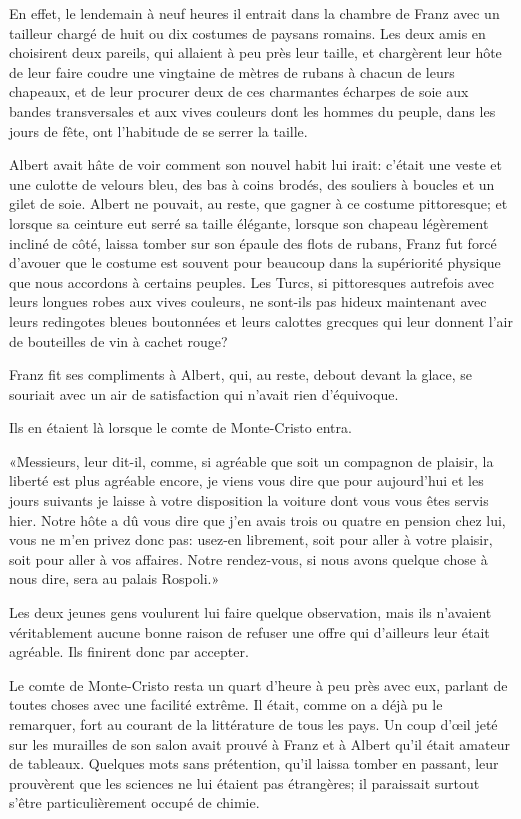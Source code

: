 En effet, le lendemain à neuf heures il entrait dans la chambre de Franz avec un tailleur chargé de huit ou dix costumes de paysans romains. Les deux amis en choisirent deux pareils, qui allaient à peu près leur taille, et chargèrent leur hôte de leur faire coudre une vingtaine de mètres de rubans à chacun de leurs chapeaux, et de leur procurer deux de ces charmantes écharpes de soie aux bandes transversales et aux vives couleurs dont les hommes du peuple, dans les jours de fête, ont l'habitude de se serrer la taille. 

Albert avait hâte de voir comment son nouvel habit lui irait: c'était une veste et une culotte de velours bleu, des bas à coins brodés, des souliers à boucles et un gilet de soie. Albert ne pouvait, au reste, que gagner à ce costume pittoresque; et lorsque sa ceinture eut serré sa taille élégante, lorsque son chapeau légèrement incliné de côté, laissa tomber sur son épaule des flots de rubans, Franz fut forcé d'avouer que le costume est souvent pour beaucoup dans la supériorité physique que nous accordons à certains peuples. Les Turcs, si pittoresques autrefois avec leurs longues robes aux vives couleurs, ne sont-ils pas hideux maintenant avec leurs redingotes bleues boutonnées et leurs calottes grecques qui leur donnent l'air de bouteilles de vin à cachet rouge? 

Franz fit ses compliments à Albert, qui, au reste, debout devant la glace, se souriait avec un air de satisfaction qui n'avait rien d'équivoque. 

Ils en étaient là lorsque le comte de Monte-Cristo entra. 

«Messieurs, leur dit-il, comme, si agréable que soit un compagnon de plaisir, la liberté est plus agréable encore, je viens vous dire que pour aujourd'hui et les jours suivants je laisse à votre disposition la voiture dont vous vous êtes servis hier. Notre hôte a dû vous dire que j'en avais trois ou quatre en pension chez lui, vous ne m'en privez donc pas: usez-en librement, soit pour aller à votre plaisir, soit pour aller à vos affaires. Notre rendez-vous, si nous avons quelque chose à nous dire, sera au palais Rospoli.» 

Les deux jeunes gens voulurent lui faire quelque observation, mais ils n'avaient véritablement aucune bonne raison de refuser une offre qui d'ailleurs leur était agréable. Ils finirent donc par accepter. 

Le comte de Monte-Cristo resta un quart d'heure à peu près avec eux, parlant de toutes choses avec une facilité extrême. Il était, comme on a déjà pu le remarquer, fort au courant de la littérature de tous les pays. Un coup d'œil jeté sur les murailles de son salon avait prouvé à Franz et à Albert qu'il était amateur de tableaux. Quelques mots sans prétention, qu'il laissa tomber en passant, leur prouvèrent que les sciences ne lui étaient pas étrangères; il paraissait surtout s'être particulièrement occupé de chimie. 

